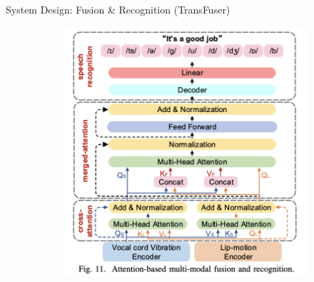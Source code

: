 \documentclass[dvipsnames, handout]{beamer}
\newcommand{\1}{\mathds{1}}	%
\begin{document}
\begin{frame}[t]{System Design: Fusion \& Recognition (TransFuser)}
\begin{figure}[ht]
\begin{subfigure}[b]{0.42\textwidth}
\includegraphics[width=\textwidth]{imgs/mmmic-fig11.png}
\end{subfigure}
\end{figure}

\end{frame}
\end{document}
